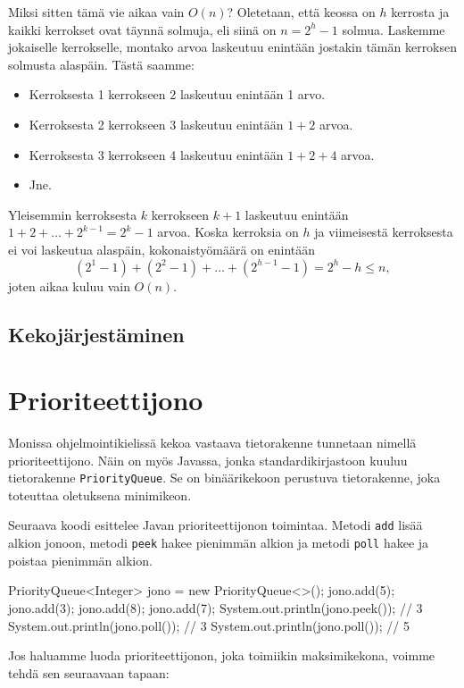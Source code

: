 Miksi sitten tämä vie aikaa vain $O(n)$?
Oletetaan, että keossa on $h$ kerrosta ja kaikki
kerrokset ovat täynnä solmuja, eli siinä on $n=2^h-1$ solmua.
Laskemme jokaiselle kerrokselle, montako arvoa laskeutuu
enintään jostakin tämän kerroksen solmusta alaspäin. Tästä saamme:

\begin{itemize}
\item Kerroksesta 1 kerrokseen 2 laskeutuu enintään 1 arvo.
\item Kerroksesta 2 kerrokseen 3 laskeutuu enintään $1+2$ arvoa.
\item Kerroksesta 3 kerrokseen 4 laskeutuu enintään $1+2+4$ arvoa.
\item Jne.
\end{itemize}

Yleisemmin kerroksesta $k$ kerrokseen $k+1$ laskeutuu
enintään $1+2+\dots+2^{k-1} = 2^k-1$ arvoa.
Koska kerroksia on $h$ ja viimeisestä kerroksesta ei voi laskeutua alaspäin,
kokonaistyömäärä on enintään
\[(2^1-1)+(2^2-1)+\dots+(2^{h-1}-1)=2^h-h \le n,\]
joten aikaa kuluu vain $O(n)$.

\subsection{Kekojärjestäminen}

\section{Prioriteettijono}

Monissa ohjelmointikielissä kekoa vastaava tietorakenne
tunnetaan nimellä prioriteettijono.
Näin on myös Javassa, jonka standardikirjastoon 
kuuluu tietorakenne \texttt{PriorityQueue}.
Se on binäärikekoon perustuva tietorakenne,
joka toteuttaa oletuksena minimikeon.

Seuraava koodi esittelee Javan prioriteettijonon toimintaa.
Metodi \texttt{add} lisää alkion jonoon,
metodi \texttt{peek} hakee pienimmän alkion
ja metodi \texttt{poll} hakee ja poistaa pienimmän alkion.

\begin{code}
PriorityQueue<Integer> jono = new PriorityQueue<>();
jono.add(5);
jono.add(3);
jono.add(8);
jono.add(7);
System.out.println(jono.peek()); // 3
System.out.println(jono.poll()); // 3
System.out.println(jono.poll()); // 5
\end{code}

Jos haluamme luoda prioriteettijonon, joka toimiikin
maksimikekona, voimme tehdä sen seuraavaan tapaan:

